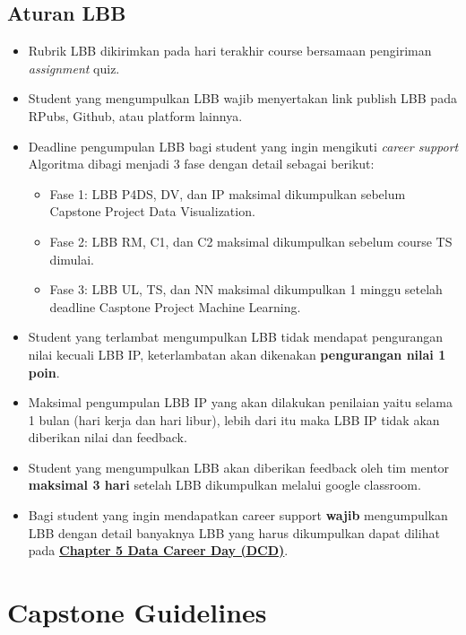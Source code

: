 \documentclass[
]{book}
\providecommand{\tightlist}{%
  \setlength{\itemsep}{0pt}\setlength{\parskip}{0pt}}
\begin{document}
\hypertarget{aturan-lbb}{%
\subsection{Aturan LBB}\label{aturan-lbb}}

\begin{itemize}
\tightlist
\item
  Rubrik LBB dikirimkan pada hari terakhir course bersamaan pengiriman \emph{assignment} quiz.
\item
  Student yang mengumpulkan LBB wajib menyertakan link publish LBB pada RPubs, Github, atau platform lainnya.
\item
  Deadline pengumpulan LBB bagi student yang ingin mengikuti \emph{career support} Algoritma dibagi menjadi 3 fase dengan detail sebagai berikut:

  \begin{itemize}
  \tightlist
  \item
    Fase 1: LBB P4DS, DV, dan IP maksimal dikumpulkan sebelum Capstone Project Data Visualization.
  \item
    Fase 2: LBB RM, C1, dan C2 maksimal dikumpulkan sebelum course TS dimulai.
  \item
    Fase 3: LBB UL, TS, dan NN maksimal dikumpulkan 1 minggu setelah deadline Casptone Project Machine Learning.
  \end{itemize}
\item
  Student yang terlambat mengumpulkan LBB tidak mendapat pengurangan nilai kecuali LBB IP, keterlambatan akan dikenakan \textbf{pengurangan nilai 1 poin}.
\item
  Maksimal pengumpulan LBB IP yang akan dilakukan penilaian yaitu selama 1 bulan (hari kerja dan hari libur), lebih dari itu maka LBB IP tidak akan diberikan nilai dan feedback.
\item
  Student yang mengumpulkan LBB akan diberikan feedback oleh tim mentor \textbf{maksimal 3 hari} setelah LBB dikumpulkan melalui google classroom.
\item
  Bagi student yang ingin mendapatkan career support \textbf{wajib} mengumpulkan LBB dengan detail banyaknya LBB yang harus dikumpulkan dapat dilihat pada \href{https://algoritma4dummies.netlify.app/data-career-day-dcd.html\#the-day-dcd}{\textbf{Chapter 5 Data Career Day (DCD)}}.
\end{itemize}

\hypertarget{capstone-guidelines}{%
\section{Capstone Guidelines}\label{capstone-guidelines}}
\end{document}
